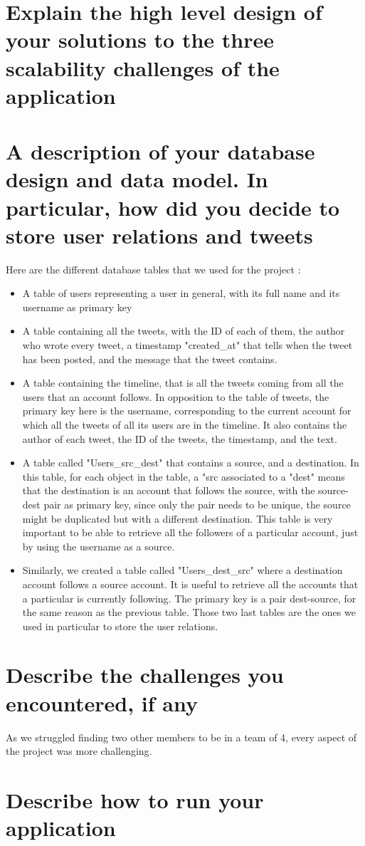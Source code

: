 \documentclass[11pt,a4paper]{article}
\begin{document}
\section{Explain the high level design of your solutions to the three scalability challenges of the application}

\section{A description of your database design and data model. In particular, how did you decide to store user relations and tweets}
Here are the different database tables that we used for the project : 
\begin{itemize}
\item A table of users representing a user in general, with its full name and its username as primary key
\item A table containing all the tweets, with the ID of each of them, the author who wrote every tweet, a timestamp "created\_at" that tells when the tweet has been posted, and the message that the tweet contains. 
\item A table containing the timeline, that is all the tweets coming from all the users that an account follows. In opposition to the table of tweets, the primary key here is the username, corresponding to the current account for which all the tweets of all its users are in the timeline. It also contains the author of each tweet, the ID of the tweets, the timestamp, and the text.
\item A table called "Users\_src\_dest" that contains a source, and a destination. In this table, for each object in the table, a "src associated to a "dest" means that the destination is an account that follows the source, with the source-dest pair as primary key, since only the pair needs to be unique, the source might be duplicated but with a different destination. This table is very important to be able to retrieve all the followers of a particular account, just by using the username as a source.
\item Similarly, we created a table called "Users\_dest\_src" where a destination account follows a source account. It is useful to retrieve all the accounts that a particular is currently following. The primary key is a pair dest-source, for the same reason as the previous table. Those two last tables are the ones we used in particular to store the user relations.
\end{itemize}

\section{Describe the challenges you encountered, if any}
As we struggled finding two other members to be in a team of 4, every aspect of the project was more challenging.
\section{Describe how to run your application}
\end{document}
